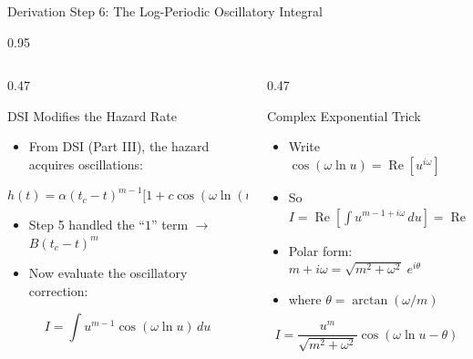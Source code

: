 \documentclass[9pt, aspectratio=169, t]{beamer}
\begin{document}
\begin{frame}{Derivation Step 6: The Log-Periodic Oscillatory Integral}
    \begin{cminipage}{0.95\textwidth}
    {\footnotesize
    \begin{columns}[T]
        \begin{column}{0.47\textwidth}
            \begin{block}{DSI Modifies the Hazard Rate}
                \begin{itemize}\setlength{\itemsep}{0pt}
                    \item From DSI (Part III), the hazard acquires oscillations:
                \end{itemize}
                \vspace{-2mm}
                $$h(t) = \alpha(t_c{-}t)^{m-1}\bigl[1 + c\cos(\omega\ln(t_c{-}t) {-} \phi')\bigr]$$
                \vspace{-4mm}
                \begin{itemize}\setlength{\itemsep}{0pt}
                    \item Step 5 handled the ``$1$'' term $\to$ $B(t_c{-}t)^m$
                    \item Now evaluate the oscillatory correction:
                \end{itemize}
                \vspace{-2mm}
                $$I = \int u^{m-1}\cos(\omega\ln u)\,du$$
            \end{block}
        \end{column}
        \begin{column}{0.47\textwidth}
            \begin{alertblock}{Complex Exponential Trick}
                \begin{itemize}\setlength{\itemsep}{0pt}
                    \item Write $\cos(\omega\ln u) = \operatorname{Re}[u^{i\omega}]$
                    \item So $I = \operatorname{Re}\!\left[\int u^{m-1+i\omega}\,du\right] = \operatorname{Re}\!\left[\frac{u^{m+i\omega}}{m+i\omega}\right]$
                    \item Polar form: $m + i\omega = \sqrt{m^2+\omega^2}\;e^{i\theta}$
                    \item where $\theta = \arctan(\omega/m)$
                \end{itemize}
                \vspace{-2mm}
                $$\boxed{I = \frac{u^m}{\sqrt{m^2+\omega^2}}\cos(\omega\ln u - \theta)}$$

\end{alertblock}
\end{column}
\end{columns}}
\end{cminipage}
\end{frame}
\end{document}
